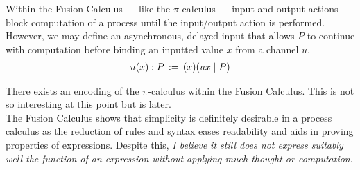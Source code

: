     \begin{example*}
        Within the Fusion Calculus --- like the $\pi$-calculus --- input and output actions block computation of a process until the input/output action is performed.
        However, we may define an asynchronous, delayed input that allows $P$ to continue with computation before binding an inputted value $x$ from a channel $u$.
        \begin{align*}
            u(x): P \, := \, (x)(ux \; | \; P)
        \end{align*}
    \end{example*}

    
    \begin{remarks}
        There exists an encoding of the $\pi$-calculus within the Fusion Calculus.
        This is not so interesting at this point but is later. \\
        The Fusion Calculus shows that simplicity is definitely desirable in a process calculus as the reduction of rules and syntax eases readability and aids in proving properties of expressions.
        Despite this, \textit{I believe it still does not express suitably well the function of an expression without applying much thought or computation}.
    \end{remarks}
